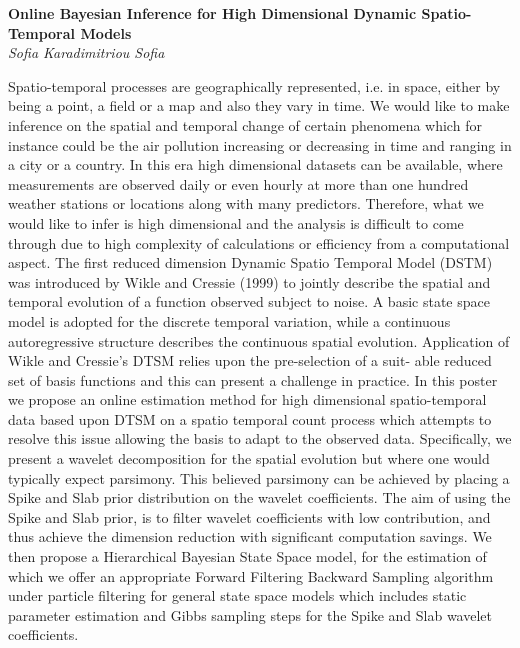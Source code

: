 \documentclass[12pt]{article}
\newcommand{\postertitle}[1]{{\Large\bf #1}\\[12pt]}
\newcommand{\authors}[1]{\emph{#1}\\}
\begin{document}
\begin{center}
\vspace*{0.5cm}
%
\postertitle{Online Bayesian Inference for High Dimensional Dynamic Spatio-Temporal Models}
%
\authors{Sofia Karadimitriou Sofia} %
%
\vspace*{0.3cm}
\end{center}

Spatio-temporal processes are geographically represented, i.e. in space, either by being a point, a field or a map and also they vary in time. We would like to make inference on the spatial and temporal change of certain phenomena which for instance could be the air pollution increasing or decreasing in time and ranging in a city or a country. In this era high dimensional datasets can be available, where measurements are observed daily or even hourly at more than one hundred weather stations or locations along with many predictors. Therefore, what we would like to infer is high dimensional and the analysis is difficult to come through due to high complexity of calculations or efficiency from a computational aspect.
The first reduced dimension Dynamic Spatio Temporal Model (DSTM) was introduced by Wikle and Cressie (1999) to jointly describe the spatial and temporal evolution of a function observed subject to noise. A basic state space model is adopted for the discrete temporal variation, while a continuous autoregressive structure describes the continuous spatial evolution.
Application of Wikle and Cressie’s DTSM relies upon the pre-selection of a suit- able reduced set of basis functions and this can present a challenge in practice. In this poster we propose an online estimation method for high dimensional spatio-temporal data based upon DTSM on a spatio temporal count process which attempts to resolve this issue allowing the basis to adapt to the observed data. Specifically, we present a wavelet decomposition for the spatial evolution but where one would typically expect parsimony. This believed parsimony can be achieved by placing a Spike and Slab prior distribution on the wavelet coefficients. The aim of using the Spike and Slab prior, is to filter wavelet coefficients with low contribution, and thus achieve the dimension reduction with significant computation savings.
We then propose a Hierarchical Bayesian State Space model, for the estimation of which we offer an appropriate Forward Filtering Backward Sampling algorithm under particle filtering for general state space models which includes static parameter estimation and Gibbs sampling steps for the Spike and Slab wavelet coefficients.
\end{document}

